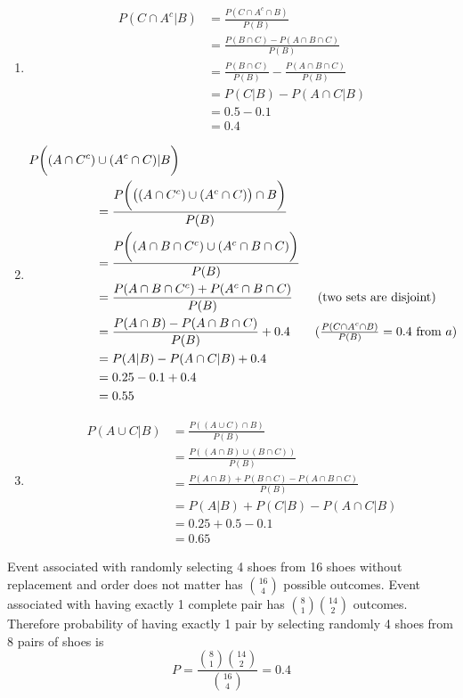 \documentclass[11pt]{article}
\begin{document}
\begin{enumerate}[label=\alph*]
  \item
  \begin{align*}
    P(C\cap A^c | B) &= \frac{P(C\cap A^c \cap B)}{P(B)} \\
    &= \frac{P(B\cap C) - P(A\cap B\cap C)}{P(B)} \\
    &= \frac{P(B\cap C)}{P(B)} -  \frac{P(A\cap B\cap C)}{P(B)} \\
    &= P(C|B) - P(A\cap C| B) \\
    &= 0.5 - 0.1 \\
    &= 0.4
  \end{align*}

  \item
  \begin{align*}
    P\bigg((A\cap C^c)&\cup (A^c\cap C)| B\bigg) \\
    &= \frac{P\bigg(\big((A\cap C^c)\cup (A^c\cap C) \big)\cap B\bigg)}{P(B)} \\
    &= \frac{P\bigg(  (A\cap B\cap C^c)\cup (A^c\cap B\cap C)  \bigg)}{P(B)} \\
    &= \frac{P(A\cap B\cap C^c) + P(A^c\cap B\cap C)}{P(B)} \tag{two sets are disjoint} \\
    &= \frac{P(A\cap B) - P(A\cap B\cap C)}{P(B)} + 0.4 \tag{$\frac{P(C\cap A^c \cap B)}{P(B)} = 0.4$ from $a$} \\
    &= P(A|B) - P(A\cap C|B) + 0.4 \\
    &= 0.25 - 0.1 + 0.4 \\
    &= 0.55
  \end{align*}

  \item
  \begin{align*}
    P(A\cup C|B) &= \frac{P((A\cup C)\cap B)}{P(B)} \\
    &= \frac{P((A\cap B)\cup (B\cap C))}{P(B)} \\
    &= \frac{P(A\cap B) + P(B\cap C) - P(A\cap B\cap C)}{P(B)} \\
    &= P(A|B) + P(C|B) - P(A\cap C|B) \\
    &= 0.25 + 0.5 - 0.1 \\
    & = 0.65
  \end{align*}
\end{enumerate}

\newpage


Event associated with randomly selecting 4 shoes from 16 shoes without replacement and order does not matter has $\binom{16}{4}$ possible outcomes. Event associated with having exactly 1 complete pair has $\binom{8}{1}\binom{14}{2}$ outcomes. Therefore probability of having exactly 1 pair by selecting randomly 4 shoes from 8 pairs of shoes is
\[
  P = \frac{\binom{8}{1}\binom{14}{2}}{\binom{16}{4}} = 0.4
\]
\end{document}
